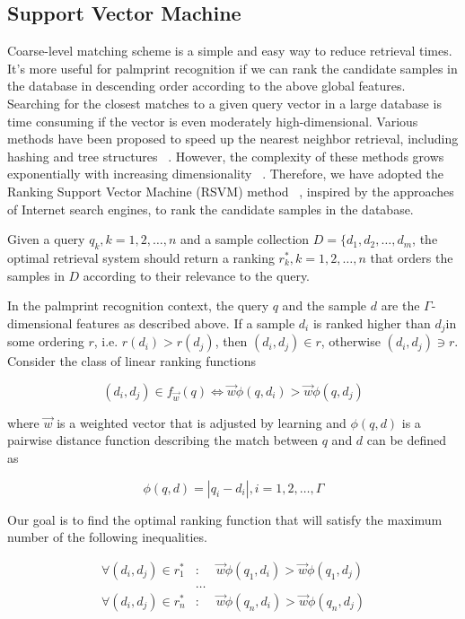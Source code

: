 \subsection{Support Vector Machine}
\label{ssec:methodology:svm}

Coarse-level matching scheme is a simple and easy way to reduce retrieval times. It’s more useful for palmprint recognition if we can rank the candidate samples in the database in descending order according to the above global features. Searching for the closest matches to a given query vector in a large database is time consuming if the vector is even moderately high-dimensional. Various methods have been proposed to speed up the nearest neighbor retrieval, including hashing and tree structures ~\cite{[20]}. However, the complexity of these methods grows exponentially with increasing dimensionality ~\cite{[21]}. Therefore, we have adopted the Ranking Support Vector Machine (RSVM) method ~\cite{[18]}, inspired by the approaches of Internet search engines, to rank the candidate samples in the database.

Given a query $q_k, k=1,2,\dots,n$ and a sample collection $D=\{d_1,d_2,\dots,d_m$, the optimal retrieval system should return a ranking $r_k^*, k=1,2,\dots,n$ that orders the samples in $D$ according to their relevance to the query.

In the palmprint recognition context, the query $q$ and the sample $d$ are the $\Gamma$-dimensional features as described above. If a sample $d_i$ is ranked higher than $d_j$in some ordering $r$, i.e. $r(d_i)>r(d_j)$, then $(d_i,d_j)\in r$, otherwise $(d_i,d_j)\ni r$. Consider the class of linear ranking functions

\begin{equation}
(d_i,d_j) \in f_{\overrightarrow{w}}(q) \Leftrightarrow \overrightarrow{w}\phi(q,d_i)> \overrightarrow{w}\phi(q,d_j)
\end{equation}

where $\overrightarrow{w}$ is a weighted vector that is adjusted by learning and $\phi(q,d)$ is a pairwise distance function describing the match between $q$ and $d$ can be defined as

\begin{equation}
\phi(q,d)=|q_i-d_i|, i=1,2,\dots,\Gamma
\end{equation}

Our goal is to find the optimal ranking function that will satisfy the maximum number of the following inequalities.

\begin{eqnarray}
\forall (d_i,d_j) \in r_1^* &:& \overrightarrow{w}\phi(q_1,d_i)> \overrightarrow{w}\phi(q_1,d_j)\\
&\dots&\\
\forall (d_i,d_j) \in r_n^* &:& \overrightarrow{w}\phi(q_n,d_i)> \overrightarrow{w}\phi(q_n,d_j)
\end{eqnarray}

